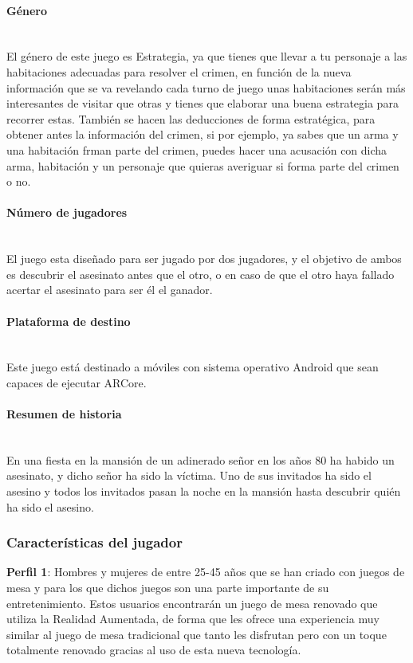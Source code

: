 \paragraph{Género}\mbox{}\\
El género de este juego es Estrategia, ya que tienes que llevar a tu personaje a las habitaciones adecuadas para resolver el crimen, en función de la nueva información que se va revelando cada turno de juego unas habitaciones serán más interesantes de visitar que otras y tienes que elaborar una buena estrategia para recorrer estas. También se hacen las deducciones de forma estratégica, para obtener antes la información del crimen, si por ejemplo, ya sabes que un arma y una habitación frman parte del crimen, puedes hacer una acusación con dicha arma, habitación y un personaje que quieras averiguar si forma parte del crimen o no.

\paragraph{Número de jugadores}\mbox{}\\
El juego esta diseñado para ser jugado por dos jugadores, y el objetivo de ambos es descubrir el asesinato antes que el otro, o en caso de que el otro haya fallado acertar el asesinato para ser él el ganador.

\paragraph{Plataforma de destino}\mbox{}\\
Este juego está destinado a móviles con sistema operativo Android que sean capaces de ejecutar ARCore.

\paragraph{Resumen de historia}\mbox{}\\
En una fiesta en la mansión de un adinerado señor en los años 80 ha habido un asesinato, y dicho señor ha sido la víctima. Uno de sus invitados ha sido el asesino y todos los invitados pasan la noche en la mansión hasta descubrir quién ha sido el asesino.

\subsubsection{Características del jugador}
\textbf{Perfil 1}: Hombres y mujeres de entre 25-45 años que se han criado con juegos de mesa y para los que dichos juegos son una parte importante de su entretenimiento. Estos usuarios encontrarán un juego de mesa renovado que utiliza la Realidad Aumentada, de forma que les ofrece una experiencia muy similar al juego de mesa tradicional que tanto les disfrutan pero con un toque totalmente renovado gracias al uso de esta nueva tecnología.\\

